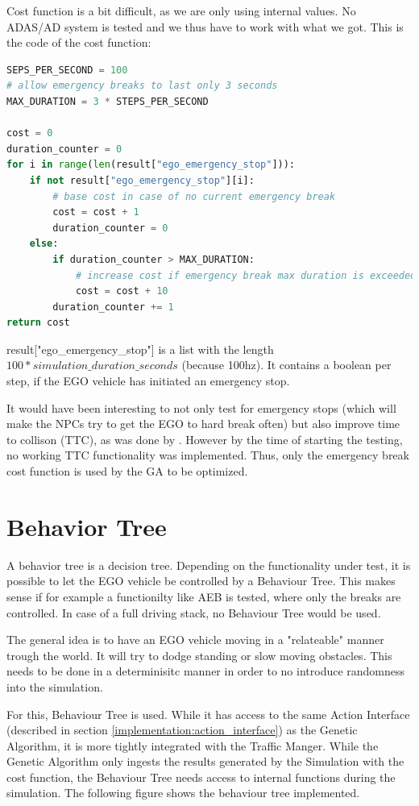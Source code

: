 Cost function is a bit difficult, as we are only using internal values. No ADAS/AD system is tested and we thus have to work with what we got.
This is the code of the cost function:

\begin{lstlisting}[language=Python, tabsize=4]
SEPS_PER_SECOND = 100
# allow emergency breaks to last only 3 seconds
MAX_DURATION = 3 * STEPS_PER_SECOND

cost = 0
duration_counter = 0
for i in range(len(result["ego_emergency_stop"])):
	if not result["ego_emergency_stop"][i]:
		# base cost in case of no current emergency break
		cost = cost + 1
		duration_counter = 0
	else:
		if duration_counter > MAX_DURATION:
			# increase cost if emergency break max duration is exceeded
			cost = cost + 10
		duration_counter += 1
return cost
\end{lstlisting}
result["ego\_emergency\_stop"] is a list with the length $100 * simulation\_duration\_seconds$ (because 100hz). It contains a boolean per step, if the EGO vehicle has initiated an emergency stop.

It would have been interesting to not only test for emergency stops (which will make the NPCs try to get the EGO to hard break often) but also improve time to collison (TTC), as was done by . However by the time of starting the testing, no working TTC functionality was implemented. Thus, only the emergency break cost function is used by the GA to be optimized.


\section{Behavior Tree}
A behavior tree is a decision tree. 
Depending on the functionality under test, it is possible to let the EGO vehicle be controlled by a Behaviour Tree. This makes sense if for example a functionilty like AEB is tested, where only the breaks are controlled. In case of a full driving stack, no Behaviour Tree would be used.

The general idea is to have an EGO vehicle moving in a "relateable" manner trough the world. It will try to dodge standing or slow moving obstacles. This needs to be done in a determinisitc manner in order to no introduce randomness into the simulation.

For this, Behaviour Tree is used. While it has access to the same Action Interface (described in section \ref{implementation:action_interface}) as the Genetic Algorithm, it is more tightly integrated with the Traffic Manger. While the Genetic Algorithm only ingests the results generated by the Simulation with the cost function, the Behaviour Tree needs access to internal functions during the simulation. The following figure shows the behaviour tree implemented.




